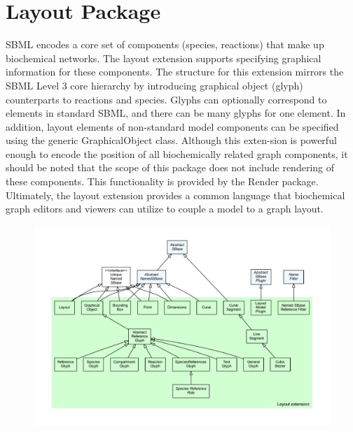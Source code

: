 \section{Layout Package}
\label{sec:layout-overview}

SBML encodes a core set of components (species, reactions) that make up
biochemical networks. The layout extension supports specifying graphical
information for these components. The structure for this extension mirrors 
the SBML Level 3 core hierarchy by introducing graphical object (glyph)
counterparts to reactions and species. Glyphs can optionally correspond
to elements in standard SBML, and there can be many glyphs for one element.
In addition, layout elements of non-standard model components can be specified
using the generic GraphicalObject class. Although this exten-sion is powerful
enough to encode the position of all biochemically related graph components,
it should be noted that the scope of this package does not include rendering
of these components. This functionality is provided by the Render package.
Ultimately, the layout extension provides a common language that biochemical
graph editors and viewers can utilize to couple a model to a graph layout.

\begin{figure}[hb]
 \centering
 \vspace*{2ex}
 \includegraphics[width=\textwidth]{../../../extensions/layout/doc/img/type_hierarchy.pdf}
 \caption[The layout extension]{}
 \label{fig:layout}
\end{figure}


